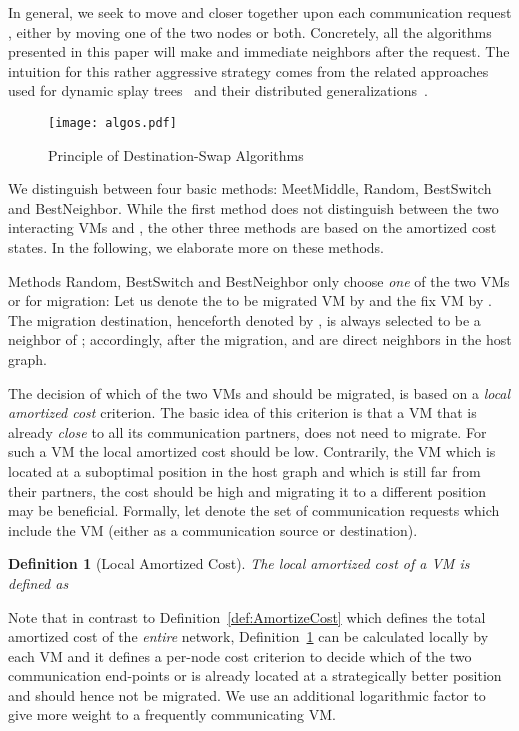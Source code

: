 \documentclass[conference]{IEEEtran}
\newtheorem{definition}{Definition}
\begin{document}
In general, we seek to move  and  closer together upon each communication request
, either by moving one of the two nodes or both.
Concretely, all the algorithms presented in this paper will make  and  immediate
neighbors after the request. The intuition for this rather aggressive
strategy comes from the related approaches used for dynamic splay trees~\cite{Sleator:1985:SBS:3828.3835} and their
distributed generalizations~\cite{ipdps13}.
\begin{wrapfigure}{l}{0.6\columnwidth}
	\centering
\centering
				\texttt{[image: algos.pdf]}\\
				\caption{Principle of Destination-Swap Algorithms}
				\label{fig:dswap}	
\end{wrapfigure}
We distinguish between four basic methods: {\sc MeetMiddle}, {\sc Random}, {\sc BestSwitch} and {\sc BestNeighbor}.
While the first method does not distinguish between the two interacting VMs  and , the other three methods are based on the amortized cost states.
In the following, we elaborate more on these methods.

Methods {\sc Random}, {\sc BestSwitch} and {\sc BestNeighbor} only choose \emph{one} of the two VMs  or  for migration:
Let us denote the to be migrated VM by   and the fix VM by .  The migration destination, henceforth denoted by , is
always selected to be a neighbor of ; accordingly, after the migration,  and  are direct neighbors in the host graph.

The decision of which of the two VMs  and  should be migrated, is based on a \emph{local amortized cost} criterion. The basic idea of this
criterion is that a VM that is already \emph{close} to all its communication partners, does not need to migrate. For such a VM the local amortized cost should be low. Contrarily, the VM which is located at a suboptimal position in the host graph and which is still far from their partners, the cost should be high and migrating it to a different position may be beneficial. Formally,
let  denote the set of communication requests which include the VM  (either as a communication source or destination).
\begin{definition}[Local Amortized Cost]\label{def:LocalAmortizeCost}
The \emph{local amortized cost} of a VM  is defined as

\end{definition}

Note that in contrast to Definition~\ref{def:AmortizeCost} which defines the total amortized cost of the \emph{entire} network,
 Definition~\ref{def:LocalAmortizeCost} can be calculated locally by each VM and it defines a per-node cost criterion to decide which of the two communication end-points  or  is already located at a strategically better position and should hence not be migrated.
We use an additional logarithmic factor  to give more weight to a frequently communicating VM.
\end{document}
